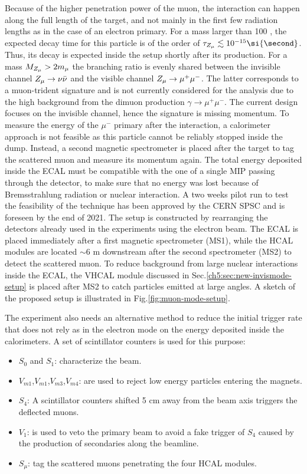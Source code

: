 Because of the higher penetration power of the muon, the interaction can happen along the full length of the target, and not mainly in the first few radiation lengths as in the case of an electron primary.
For a mass larger than 100 \mev, the expected decay time for this particle is of the order of $\tau_{\DMU} \lesssim 10^{-15} \si{\second}$. Thus, its decay is expected inside the setup shortly after its production. For a mass $M_{Z_{\mu}} > 2 m_{\mu}$ the branching ratio is evenly shared between the invisible channel $Z_{\mu} \to \nu \bar{\nu}$ and the visible channel $Z_{\mu} \to \mu^+ \mu^-$. The latter corresponds to a muon-trident signature and is not currently considered for the analysis due to the high background from the dimuon production $\gamma \to \mu^+ \mu^-$. The current design focuses on the invisible channel, hence the signature is missing momentum. To measure the energy of the $\mu^-$ primary after the interaction, a calorimeter approach is not feasible as this particle cannot be reliably stopped inside the dump. Instead, a second magnetic spectrometer is placed after the target to tag the scattered muon and measure its momentum again. The total energy deposited inside the ECAL must be compatible with the one of a single MIP passing through the detector, to make sure that no energy was lost because of Bremsstrahlung radiation or nuclear interaction. A two weeks pilot run to test the feasibility of the technique has been approved by the CERN SPSC and is foreseen by the end of 2021. The setup is constructed by rearranging the detectors already used in the experiments using the electron beam. The ECAL is placed immediately after a first magnetic spectrometer (MS1), while the HCAL modules are located $\sim$6 \si{\meter} downstream after the second spectrometer (MS2) to detect the scattered muon. To reduce background from large nuclear interactions inside the ECAL, the VHCAL module discussed in Sec.\ref{ch5:sec:new-invismode-setup} is placed after MS2 to catch particles emitted at large angles. A sketch of the proposed setup is illustrated in Fig.\ref{fig:muon-mode-setup}.

The experiment also needs an alternative method to reduce the initial trigger rate that does not rely as in the electron mode on the energy deposited inside the calorimeters. A set of scintillator counters is used for this purpose:
\begin{itemize}
\item $S_0$ and $S_1$: characterize the beam.
\item $V_{m1}$,$V_{m1}$,$V_{m3}$,$V_{m4}$:  are used to reject low energy particles entering the magnets.
\item $S_4$: A scintillator counters shifted 5 \si{\centi\meter} away from the beam axis triggers the deflected muons.
\item $V_1$: is used to veto the primary beam to avoid a fake trigger of $S_4$ caused by the production of secondaries along the beamline.
\item $S_{\mu}$: tag the scattered muons penetrating the four HCAL modules.
\end{itemize}

